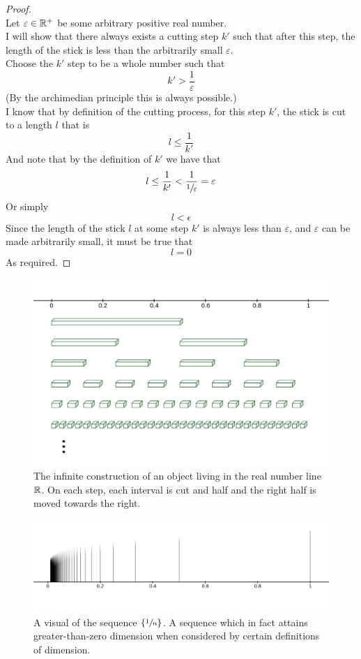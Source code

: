 \documentclass[11pt]{ekblite}
\begin{document}
\begin{example}
\begin{proof}
		\\[0.2in]Let $\varepsilon \in \mathbb{R}^+$ be some arbitrary positive real number.
		\\[0.2in]I will show that there always exists a cutting step $k'$ such that after this step, the length of the stick is less than the arbitrarily small $\varepsilon$. 
		\\[0.2in]Choose the $k'$ step to be a whole number such that
		\[k' > \frac{1}{\varepsilon}\]
		(By the archimedian principle this is always possible.)
		\\[0.2in]I know that by definition of the cutting process, for this step $k'$, the stick is cut to a length $l$ that is
		\[l \le \frac{1}{k'}\] 
		And note that by the definition of $k'$ we have that
		\[l \le \frac{1}{k'} < \frac{1}{\sfrac{1}{\varepsilon}} = \varepsilon\]
		Or simply
		\[l < \epsilon\]
		Since the length of the stick $l$ at some step $k'$ is always less than $\varepsilon$, and $\varepsilon$ can be made arbitrarily small, it must be true that 
		\[l = 0\] 
		As required.
	\end{proof}
\end{example}
\newpage
\begin{figure}[h]
	\includegraphics[scale=0.25]{img/c6.jpg}
	\caption{The infinite construction of an object living in the real number line $\mathbb{R}$. On each step, each interval is cut and half and the right half is moved towards the right.}
\end{figure}
\begin{figure}[h]
	\includegraphics[scale=0.25]{img/c21.jpg}
	\caption{A visual of the sequence $\{\sfrac{1}{n}\}$. A sequence which in fact attains greater-than-zero dimension when considered by certain definitions of dimension.}
\end{figure}
\end{document}
